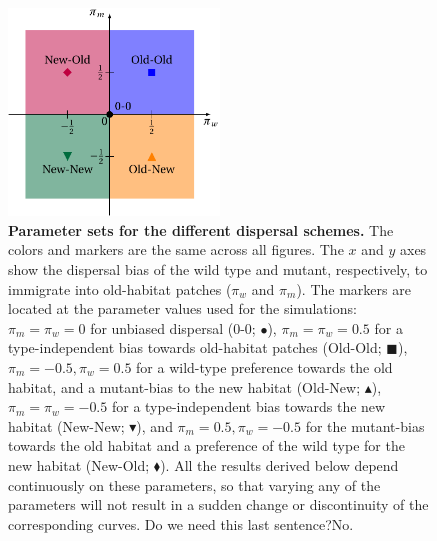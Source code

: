 \documentclass[a4paper,11pt]{article}
\begin{document}
\begin{figure}[t]
    \centering
    \includegraphics[width=0.5\textwidth]{fig1.pdf}
    \caption{\textbf{Parameter sets for the different dispersal schemes.} \small The colors and markers are the same across all figures. The $x$ and $y$ axes show the dispersal bias of the wild type and mutant, respectively, to immigrate into old-habitat patches ($\pi_w$ and $\pi_m$). The markers are located at the parameter values used for the simulations: $\pi_m=\pi_w=0$ for unbiased dispersal (0-0; {\Large $\bullet$}), $\pi_m=\pi_w=0.5$ for a type-independent bias towards old-habitat patches (Old-Old; {\color{blue} $\blacksquare$}), $\pi_m=-0.5,\pi_w=0.5$ for a wild-type preference towards the old habitat, and a mutant-bias to the new habitat (Old-New; {\color{orange}$\blacktriangle$}), $\pi_m=\pi_w=-0.5$ for a type-independent bias towards the new habitat (New-New; {\color{darkgreen}$\blacktriangledown$}), and $\pi_m=0.5,\pi_w=-0.5$ for the mutant-bias towards the old habitat and a preference of the wild type for the new habitat (New-Old; {\color{purple}$\blacklozenge$}). All the results derived below depend continuously on these parameters, so that varying any of the parameters will not result in a sudden change or discontinuity of the corresponding curves. {\color{orange} Do we need this last sentence?\color{blue}No.}}
    \label{fig:disp_schemes}
\end{figure}
\end{document}
